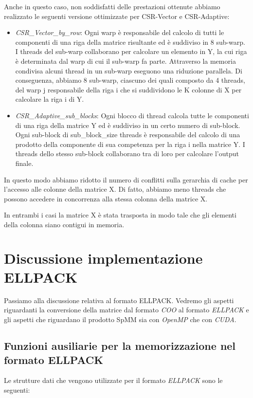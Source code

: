 \documentclass{article}
\begin{document}
Anche in questo caso, non soddisfatti delle prestazioni ottenute abbiamo realizzato le seguenti versione ottimizzate per CSR-Vector e CSR-Adaptive:
  \begin{itemize}
   \item \textit{CSR\_Vector\_by\_row}: 
    Ogni warp è responsabile del calcolo di tutti le componenti di una riga della matrice risultante ed è suddiviso in 8 sub-warp. I threads del sub-warp collaborano per calcolare un elemento in Y, la cui riga è determinata dal warp di cui il sub-warp fa parte. Attraverso la memoria condivisa alcuni thread in un sub-warp eseguono una riduzione parallela. Di conseguenza, abbiamo 8 sub-warp, ciascuno dei quali composto da 4 threads, del warp j responsabile della riga i che si suddividono le K colonne di X per calcolare la riga i di Y.    
   \item \textit{CSR\_Adaptive\_sub\_blocks}: Ogni blocco di thread calcola tutte le componenti di una riga della matrice Y ed è suddiviso in un certo numero di sub-block. Ogni sub-block di sub\_block\_size threads è responsabile del calcolo di una prodotto della componente di sua competenza per la riga i nella matrice Y.  I threads dello stesso sub-block collaborano tra di loro per calcolare l'output finale.
   \end{itemize}
   
In questo modo abbiamo ridotto il numero di conflitti sulla gerarchia di cache per l'accesso alle colonne della matrice X. Di fatto, abbiamo meno threads che possono accedere in concorrenza alla stessa colonna della matrice X.

In entrambi i casi la matrice X è stata trasposta in modo tale che gli elementi della colonna siano contigui in memoria.

\section{Discussione implementazione ELLPACK}
Passiamo alla discussione relativa al formato ELLPACK. Vedremo gli aspetti riguardanti la conversione della matrice dal formato \textit{COO} al formato \textit{ELLPACK} e gli aspetti che riguardano il prodotto SpMM sia con \textit{OpenMP} che con \textit{CUDA}.

\subsection{Funzioni ausiliarie per la memorizzazione nel formato ELLPACK}
Le strutture dati che vengono utilizzate per il formato \textit{ELLPACK} sono le seguenti:
\end{document}
